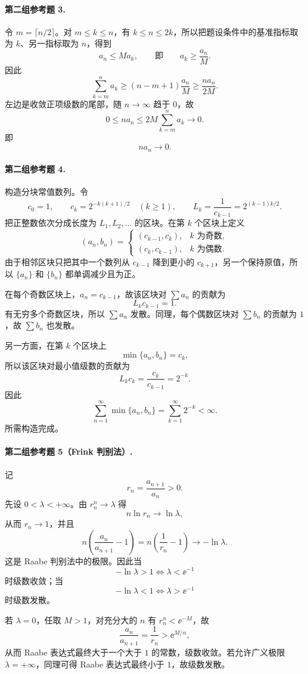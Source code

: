 \paragraph{第二组参考题 3.}
\begin{xsolution}
令 $m=\lceil n/2\rceil$。对 $m\leq k\leq n$，有 $k\leq n\leq2k$，所以把题设条件中的基准指标取为 $k$、另一指标取为 $n$，得到
\[
 a_n\leq Ma_k,
 \qquad\text{即}\qquad
 a_k\geq\frac{a_n}{M}.
\]
因此
\[
 \sum_{k=m}^{n}a_k
 \geq(n-m+1)\frac{a_n}{M}
 \geq\frac{n a_n}{2M}.
\]
左边是收敛正项级数的尾部，随 $n\to\infty$ 趋于 $0$，故
\[
 0\leq na_n\leq2M\sum_{k=m}^{n}a_k\longrightarrow0.
\]
即
\[
 \boxed{na_n\to0}.
\]
\end{xsolution}

\paragraph{第二组参考题 4.}
\begin{xsolution}
构造分块常值数列。令
\[
 c_0=1,
 \qquad
 c_k=2^{-k(k+1)/2}\quad(k\geq1),
 \qquad
 L_k=\frac1{c_{k-1}}=2^{(k-1)k/2}.
\]
把正整数依次分成长度为 $L_1,L_2,\ldots$ 的区块。在第 $k$ 个区块上定义
\[
 (a_n,b_n)=
 \begin{cases}
 (c_{k-1},c_k),&k\text{ 为奇数},\\
 (c_k,c_{k-1}),&k\text{ 为偶数}.
 \end{cases}
\]
由于相邻区块只把其中一个数列从 $c_{k-1}$ 降到更小的 $c_{k+1}$，另一个保持原值，所以 $\{a_n\}$ 和 $\{b_n\}$ 都单调减少且为正。

在每个奇数区块上，$a_n=c_{k-1}$，故该区块对 $\sum a_n$ 的贡献为
\[
 L_kc_{k-1}=1.
\]
有无穷多个奇数区块，所以 $\sum a_n$ 发散。同理，每个偶数区块对 $\sum b_n$ 的贡献为 $1$，故 $\sum b_n$ 也发散。

另一方面，在第 $k$ 个区块上
\[
 \min\{a_n,b_n\}=c_k,
\]
所以该区块对最小值级数的贡献为
\[
 L_kc_k=\frac{c_k}{c_{k-1}}=2^{-k}.
\]
因此
\[
 \sum_{n=1}^{\infty}\min\{a_n,b_n\}
 =\sum_{k=1}^{\infty}2^{-k}<\infty.
\]
所需构造完成。
\end{xsolution}

\paragraph{第二组参考题 5（Frink 判别法）.}
\begin{xsolution}
记
\[
 r_n=\frac{a_{n+1}}{a_n}>0.
\]
先设 $0<\lambda<+\infty$。由 $r_n^n\to\lambda$ 得
\[
 n\ln r_n\to\ln\lambda,
\]
从而 $r_n\to1$，并且
\[
 n\left(\frac{a_n}{a_{n+1}}-1\right)
 =n\left(\frac1{r_n}-1\right)
 \longrightarrow-\ln\lambda.
\]
这是 Raabe 判别法中的极限。因此当
\[
 -\ln\lambda>1\iff\lambda<\ee^{-1}
\]
时级数收敛；当
\[
 -\ln\lambda<1\iff\lambda>\ee^{-1}
\]
时级数发散。

若 $\lambda=0$，任取 $M>1$，对充分大的 $n$ 有 $r_n^n<\ee^{-M}$，故
\[
 \frac{a_n}{a_{n+1}}=\frac1{r_n}>\ee^{M/n},
\]
从而 Raabe 表达式最终大于一个大于 $1$ 的常数，级数收敛。若允许广义极限 $\lambda=+\infty$，同理可得 Raabe 表达式最终小于 $1$，故级数发散。
\end{xsolution}

